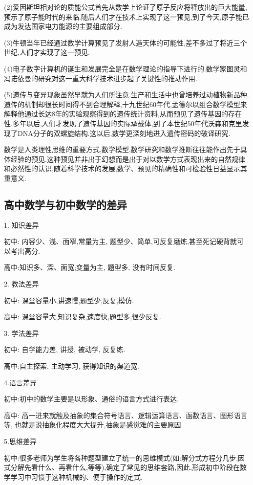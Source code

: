 (2)爱因斯坦相对论的质能公式首先从数学上论证了原子反应将释放出的巨大能量,预示了原子能时代的来临.随后人们才在技术上实现了这一预见,到了今天,原子能已成为发达国家电力能源的主要组成部分.

(3)牛顿当年已经通过数学计算预见了发射人造天体的可能性,差不多过了将近三个世纪,人们才实现了这一预见.

(4)电子数字计算机的诞生和发展完全是在数学理论的指导下进行的.数学家图灵和冯诺依曼的研究对这一重大科学技术进步起了关键性的推动作用.

(5)遗传与变异现象虽然早就为人们所注意.生产和生活中也曾培养过动植物新品种.遗传的机制却很长时间得不到合理解释,十九世纪60年代,孟德尔以组合数学模型来解释他通过长达8年的实验观察得到的遗传统计资料,从而预见了遗传基因的存在性.多年以后,人们才发现了遗传基因的实际承载体,到了本世纪50年代沃森和克里发现了DNA分子的双螺旋结构.这以后,数学更深刻地进入遗传密码的破译研究.

数学是人类理性思维的重要方式,数学模型,数学研究和数学推断往往能作出先于具体经验的预见.这种预见并非出于幻想而是出于对以数学方式表现出来的自然规律和必然性的认识,随着科学技术的发展,数学、预见的精确性和可检验性日益显示其重意义.

\subsection{高中数学与初中数学的差异}
1. 知识差异

初中: 内容少、浅、面窄,常量为主, 题型少、简单,可反复磨炼,甚至死记硬背就可以考出高分.

高中:知识多、深、面宽;变量为主, 题型多, 没有时间反复.

2. 教法差异

初中: 课堂容量小,讲速慢,题型少,反复,模仿.

高中: 课堂容量大,知识复杂,速度快,题型多,很少反复.

3. 学法差异

初中: 自学能力差, 讲授, 被动学, 反复练.

高中:自主探索, 主动学习, 获得知识的渠道宽.

4.语言差异

初中:初中的数学主要是以形象、通俗的语言方式进行表达.

高中: 高一进来就触及抽象的集合符号语言、逻辑运算语言、函数语言、图形语言等, 也就是说抽象化程度大大提升,抽象是感觉难的主要原因.

5.思维差异

初中:很多老师为学生将各种题型建立了统一的思维模式(如:解分式方程分几步;因式分解先看什么、再看什么,等等),确定了常见的思维套路,因此,形成初中阶段在数学学习中习惯于这种机械的、便于操作的定式.

